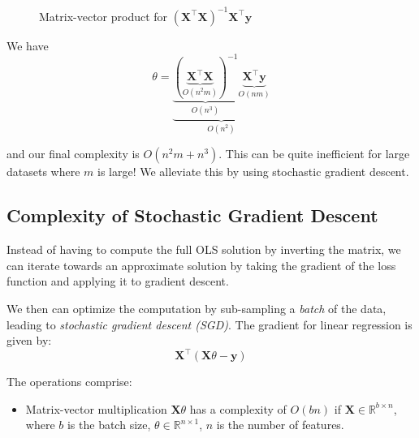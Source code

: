\begin{enumerate}
\begin{figure}[h!]
              \caption{Matrix-vector product for $(\bm{X}^\top \bm{X})^{-1} \bm{X}^\top \bm{y}$}
              \label{fig:matrix_vector_product_2}
          \end{figure}



          We have
          \begin{equation}
              \theta =
              \underbrace{
                  \underbrace{
                      \left( \underbrace{\bm{X}^\top \bm{X}}_{O(n^2m)} \right)^{-1}
                  }_{O(n^3)}
                  \underbrace{
                      \bm{X}^\top \bm{y}
                  }_{O(nm)}}_{O(n^2)}
          \end{equation}

          and our final complexity is \( O(n^2 m + n^3) \). This can be quite inefficient for large datasets where $m$ is large! We alleviate this by using stochastic gradient descent.

          \subsection{Complexity of Stochastic Gradient Descent}

          Instead of having to compute the full OLS solution by inverting the matrix, we can iterate towards an approximate solution by taking the gradient of the loss function and applying it to gradient descent. \bigskip

          We then can optimize the computation by sub-sampling a \textit{batch} of the data, leading to \textit{stochastic gradient descent (SGD)}. The gradient for linear regression is given by:
          \[
              \bm{X}^\top (\bm{X} \theta - \bm{y})
          \]

          The operations comprise:
          \begin{itemize}
              \item Matrix-vector multiplication \( \bm{X} \theta \) has a complexity of \( O(b n) \) if \( \bm{X} \in \mathbb{R}^{b \times n} \), where \( b \) is the batch size, $\theta \in \mathbb{R}^{n \times 1}$, $n$ is the number of features.


\end{itemize}
\end{enumerate}
